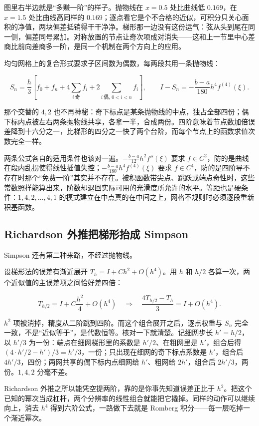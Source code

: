图里右半边就是``多赚一阶''的样子。抛物线在 \(x=0.5\) 处比曲线低 \(0.169\)，在 \(x=1.5\) 处比曲线高同样的 \(0.169\)；逐点看它是个不合格的近似，可积分只关心面积的净值，两块偏差抵销得干干净净。梯形那一边没有这份运气：弦从头到尾在同一侧，偏差同号累加。对称放置的节点让奇次项成对消失——这和上一节里中心差商比前向差商多一阶，是同一个机制在两个方向上的应用。

均匀网格上的复合形式要求子区间数为偶数，每两段共用一条抛物线：

\[
S_n=\frac h3\left[f_0+f_n+4\sum_{i\ \text{奇}}f_i+2\sum_{i\ \text{偶},\,0<i<n}f_i\right],
\qquad
I-S_n=-\frac{b-a}{180}h^4f^{(4)}(\xi).
\]

那个交替的 \(4,2\) 也不再神秘：奇下标点是某条抛物线的中点，独占全部四份；偶下标内点被左右两条抛物线共享，各拿一半，合成两份。四阶意味着节点数加倍误差降到十六分之一，比梯形的四分之一快了两个台阶，而每个节点上的函数求值次数完全一样。

两条公式各自的适用条件也该对一遍。\(-\frac{b-a}{12}h^2f''(\xi)\) 要求 \(f\in C^2\)，防的是曲线在段内乱拐使得线性插值失控；\(-\frac{b-a}{180}h^4f^{(4)}(\xi)\) 要求 \(f\in C^4\)，防的是四阶导不存在时那个``免费一阶''其实并不存在。被积函数带尖点、跳跃或端点奇性时，这些常数照样能算出来，阶数却退回实际可用的光滑度所允许的水平。等距也是硬条件：\(1,4,2,\dots,4,1\) 的模式建立在中点真的在中间之上，网格不规则时必须逐段重新积基函数。

\subsection{Richardson 外推把梯形抬成 Simpson}

Simpson 还有第二种来路，不经过抛物线。

设梯形法的误差有渐近展开 \(T_h=I+Ch^2+O(h^4)\)。用 \(h\) 和 \(h/2\) 各算一次，两个近似值的主误差项之间恰好差四倍：

\[
T_{h/2}=I+C\frac{h^2}{4}+O(h^4)
\quad\Longrightarrow\quad
\frac{4T_{h/2}-T_h}{3}=I+O(h^4).
\]

\(h^2\) 项被消掉，精度从二阶跳到四阶。而这个组合展开之后，逐点权重与 \(S_n\) 完全一致，不是``近似等于''，是代数恒等。核对一下就清楚。记细网步长 \(h'=h/2\)，以 \(h'/3\) 为一份：端点在细网梯形里的系数是 \(h'/2\)、在粗网里是 \(h'\)，组合后得 \((4\cdot h'/2-h')/3=h'/3\)，一份；只出现在细网的奇下标点系数是 \(h'\)，组合后 \(4h'/3\)，四份；两网共享的偶下标内点细网给 \(h'\)、粗网给 \(2h'\)，组合后 \(2h'/3\)，两份。\(1,4,2\) 分毫不差。

Richardson 外推之所以能凭空提两阶，靠的是你事先知道误差正比于 \(h^2\)。把这个已知的幂次当成杠杆，两个分辨率的线性组合就能把它撬掉。同样的动作可以继续向上，消去 \(h^4\) 得到六阶公式，一路做下去就是 Romberg 积分——每一层吃掉一个渐近幂次。

